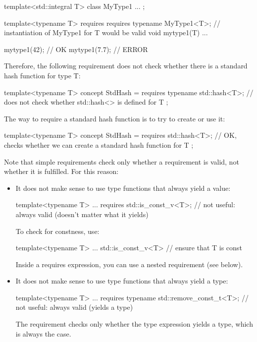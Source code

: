 \begin{cpp}
template<std::integral T>
class MyType1 {
	...
};

template<typename T>
requires requires {
	typename MyType1<T>; // instantiation of MyType1 for T would be valid
}
void mytype1(T) {
	...
}

mytype1(42); // OK
mytype1(7.7); // ERROR
\end{cpp}

Therefore, the following requirement does not check whether there is a standard hash function for type T:

\begin{cpp}
template<typename T>
concept StdHash = requires {
	typename std::hash<T>; // does not check whether std::hash<> is defined for T
};
\end{cpp}

The way to require a standard hash function is to try to create or use it:

\begin{cpp}
template<typename T>
concept StdHash = requires {
	std::hash<T>{}; // OK, checks whether we can create a standard hash function for T
};
\end{cpp}

Note that simple requirements check only whether a requirement is valid, not whether it is fulfilled. For this reason:

\begin{itemize}
\item
It does not make sense to use type functions that always yield a value:

\begin{cpp}
template<typename T>
... requires {
	std::is_const_v<T>; // not useful: always valid (doesn’t matter what it yields)
}
\end{cpp}

To check for constness, use:

\begin{cpp}
template<typename T>
... std::is_const_v<T> // ensure that T is const
\end{cpp}

Inside a requires expression, you can use a nested requirement (see below).

\item
It does not make sense to use type functions that always yield a type:

\begin{cpp}
template<typename T>
... requires {
	typename std::remove_const_t<T>; // not useful: always valid (yields a type)
}
\end{cpp}

The requirement checks only whether the type expression yields a type, which is always the case.
\end{itemize}

